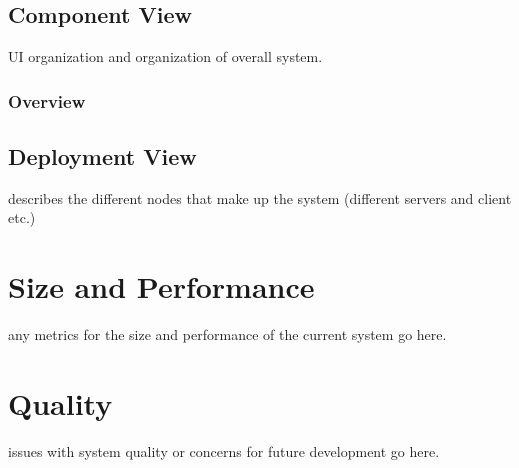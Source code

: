 \documentclass[11pt]{article}
\begin{document}
\subsection{Component View}
UI organization and organization of overall system.
\subsubsection{Overview}
\subsection{Deployment View}
describes the different nodes that make up the system (different servers and client etc.)
\section{Size and Performance}
any metrics for the size and performance of the current system go here.
\section{Quality}
issues with system quality or concerns for future development go here.
\end{document}
